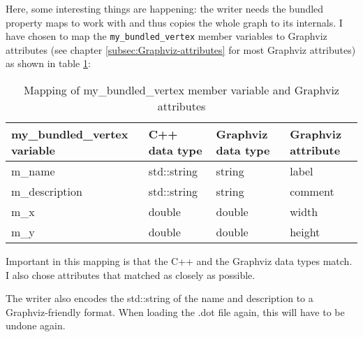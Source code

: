 

Here, some interesting things are happening: the writer needs the bundled
property maps to work with and thus copies the whole graph to its internals.
I have chosen to map the \verb;my_bundled_vertex; member variables to Graphviz
attributes (see chapter \ref{subsec:Graphviz-attributes} 
for most Graphviz attributes) as shown in table 
\ref{tab:Mapping-of-my_bundled_vertex-to-Graphviz-attributes}:


\begin{table}[h!]
  \centering
  \begin{tabular}{l l l l} 
    \hline
    my\_bundled\_vertex variable & C++ data type & Graphviz data type & Graphviz attribute \\
    \hline
    m\_name                      & std::string   & string             & label              \\
    m\_description               & std::string   & string             & comment            \\
    m\_x                         & double        & double             & width              \\
    m\_y                         & double        & double             & height             \\
    \hline
  \end{tabular}
  \caption{
    Mapping of my\_bundled\_vertex member variable and Graphviz attributes
  }
  \label{tab:Mapping-of-my_bundled_vertex-to-Graphviz-attributes}
\end{table}

Important in this mapping is that the C++ and the Graphviz data types match.
I also chose attributes that matched as closely as possible.

The writer also encodes the std::string of the name and description to a
Graphviz-friendly format.
When loading the .dot file again, this will have to be undone again.

